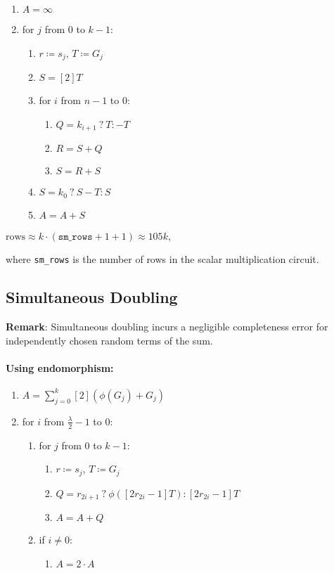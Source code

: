 \begin{enumerate}
    \item $A = \infty$
    \item for $j$ from $0$ to $k-1$:
    \begin{enumerate}
        \item $r \coloneqq s_j$, $T \coloneqq G_j$
        \item $S = [2]T$
        \item for $i$ from $n - 1$ to $0$:
        \begin{enumerate}
            \item $Q = k_{i + 1} \: ? \: T : -T$
            \item $R = S + Q$
            \item $S = R + S$
        \end{enumerate}
        \item $S = k_0 \: ? \: S - T : S$
        \item $A = A + S$
    \end{enumerate}
\end{enumerate}


\begin{center}
    $\text{rows} \approx k \cdot (\texttt{sm\_rows} + 1 + 1) \approx 105k$,
\end{center}
where \texttt{sm\_rows} is the number of rows in the scalar multiplication circuit.

\subsection{Simultaneous Doubling}

\textbf{Remark}:
Simultaneous doubling incurs a negligible completeness error for independently chosen random terms of the sum.

\paragraph{Using endomorphism:}

\begin{enumerate}
    \item $A = \sum\limits_{j = 0}^{k} [2](\phi(G_j) + G_j)$
    \item for $i$ from $\frac{\lambda}{2} - 1$ to $0$:
    \begin{enumerate}
        \item for $j$ from $0$ to $k-1$:
        \begin{enumerate}
            \item $r \coloneqq s_j$, $T \coloneqq G_j$
            \item $Q = r_{2i + 1} \: ? \: \phi([2r_{2i} - 1]T) : [2r_{2i} - 1]T$
            \item $A = A + Q$
        \end{enumerate}
        \item if $i \neq 0$:
        \begin{enumerate}
            \item $A = 2 \cdot A$
        \end{enumerate}
    \end{enumerate}
\end{enumerate}

